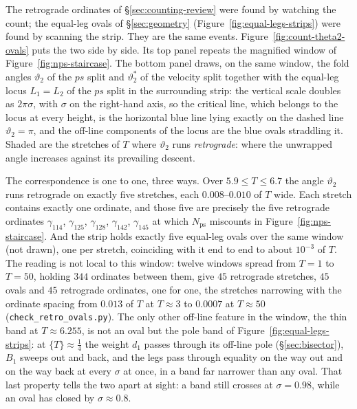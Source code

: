 \documentclass[11pt]{article}
\theoremstyle{definition}
\begin{document}
The retrograde ordinates of \S\ref{sec:counting-review} were found by watching
the count; the equal-leg ovals of \S\ref{sec:geometry}
(Figure~\ref{fig:equal-legs-strips}) were found by scanning the strip. They
are the same events. Figure~\ref{fig:count-theta2-ovals} puts the two
side by side. Its top panel repeats the magnified window of
Figure~\ref{fig:nps-staircase}. The bottom panel draws, on the same window,
the fold angles $\vartheta_2$ of the $ps$ split and $\vartheta_2^{\ast}$ of
the velocity split together with the equal-leg
locus $L_1=L_2$ of the $ps$ split in the surrounding strip: the vertical scale
doubles as $2\pi\sigma$, with $\sigma$ on the right-hand axis, so the critical
line, which belongs to the locus at every height, is the horizontal blue line
lying exactly on the dashed line $\vartheta_2=\pi$, and the off-line
components of the locus are the blue ovals straddling it. Shaded are the
stretches of $T$ where $\vartheta_2$ runs \emph{retrograde}: where the
unwrapped angle increases against its prevailing descent.

The correspondence is one to one, three ways. Over $5.9\leq T\leq6.7$ the
angle $\vartheta_2$ runs retrograde on exactly five stretches, each
$0.008$--$0.010$ of $T$ wide. Each stretch contains exactly one ordinate, and
those five are precisely the five retrograde ordinates $\gamma_{114}$,
$\gamma_{125}$, $\gamma_{128}$, $\gamma_{142}$, $\gamma_{145}$ at which
$N_{\mathrm{ps}}$ miscounts in Figure~\ref{fig:nps-staircase}. And the strip
holds exactly five equal-leg ovals over the same window (not drawn), one per
stretch,
coinciding with it end to end to about $10^{-3}$ of $T$. The reading is not
local to this window: twelve windows spread from $T=1$ to $T=50$, holding
$344$ ordinates between them, give $45$ retrograde stretches, $45$ ovals and
$45$ retrograde ordinates, one for one, the stretches narrowing with the
ordinate spacing from $0.013$ of $T$ at $T\approx3$ to $0.0007$ at
$T\approx50$ (\texttt{check\_retro\_ovals.py}). The only other
off-line feature in the window, the thin band at $T\approx6.255$, is not an
oval but the pole band of Figure~\ref{fig:equal-legs-strips}: at
$\{T\}\approx\tfrac14$ the weight $d_1$ passes through its off-line pole
(\S\ref{sec:bisector}), $B_1$ sweeps out and back, and the legs pass through
equality on the way out and on the way back at every $\sigma$ at once, in a
band far narrower than any oval. That last property tells the two apart at
sight: a band still crosses at $\sigma=0.98$, while an oval has closed by
$\sigma\approx0.8$.
\end{document}
